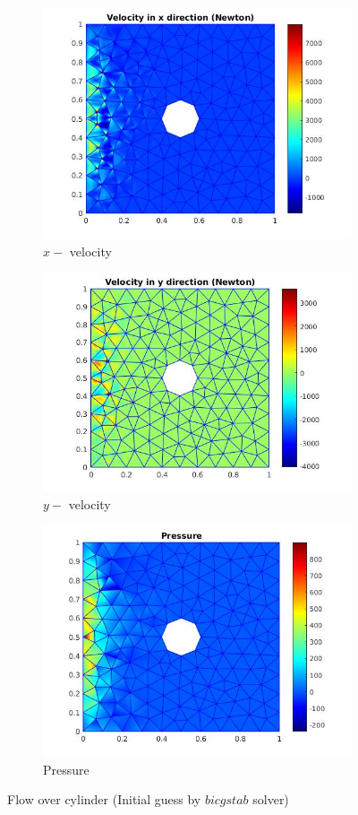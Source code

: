 \documentclass[a4paper,twoside,openright]{book}
\begin{document}
\begin{figure}
  \begin{subfigure}{\textwidth}
    \includegraphics[width=0.8\linewidth]{cylinder_newton_vx_bicgstab.jpg}
    \caption{$x-$ velocity }
  \label{x_vel_navier_stoke_bicgstab}
  \end{subfigure}
  \begin{subfigure}{\textwidth}
    \includegraphics[width=0.8\linewidth]{cylinder_newton_vy_bicgstab.jpg}
    \caption{$y-$ velocity}
  \label{y_vel_navier_stoke_bicgstab}
  \end{subfigure}
  \begin{subfigure}{\textwidth}
    \includegraphics[width=0.8\linewidth]{cylinder_newton_pressure_bicgstab.jpg}
    \caption{Pressure}
  \label{pressure_navier_stoke_bicgstab}
  \end{subfigure}
\caption{Flow over cylinder (Initial guess by $bicgstab$ solver)}
\label{flow_over_cylinder_bicgstab_n_s}
\end{figure}
\end{document}

